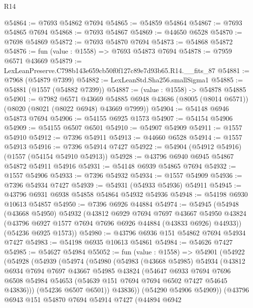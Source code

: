 \begin{lexlean}{R14}
\begin{coremodule}
@54864 := @7693 @54862 @7694
@54865 := @54859 @54864
@54867 := @7693 @54865 @7694
@54868 := @7693 @54867
@54869 := @44650 @6528
@54870 := @7698 @54869
@54872 := @7693 @54870 @7694
@54873 := @54868 @54872
@54876 := fun (value : @1558) => @7693 @54873 @7694
@54878 := @7959 @6571 @43669
@54879 := LexLeanPreserve.C798b143e659cb50f0f127c89e7d93b65.R14.__fits_87
@54881 := @7968 (@54879 @7399)
@54882 := LexLeanStd.Sha256.smallSigma1
@54885 := @54881 (@1557 (@54882 @7399))
@54887 := (value : @1558) -> @54878 @54885
@54901 := @7982
    @6571
    @43669
    @54885
    @6948
    @43686
    (@8005 (@8014 @6571))
    (@8020 (@8021 (@8022 @6948) @43669 @7999))
@54904 := @54148 @6946 @54873 @7694
@54906 := @54155 @6925 @1573
@54907 := @54154 @54906
@54909 := @54155 @6507 @6501
@54910 := @54907 @54909
@54911 := @1557 @54910
@54912 := @7396 @54911
@54913 := @44660 @6528
@54914 := @1557 @54913
@54916 := @7396 @54914 @7427
@54922 := @54904 (@54912 @54916) (@1557 (@54154 @54910 @54913))
@54928 := @43796 @6940 @6945 @54867 @54872 @54911 @54916
@54931 := @54148 @6939 @54865 @7694
@54932 := @1557 @54906
@54933 := @7396 @54932
@54934 := @1557 @54909
@54936 := @7396 @54934 @7427
@54939 := @54931 (@54933 @54936) @54911
@54945 := @43796 @6931 @6938 @54858 @54864 @54932 @54936
@54948 := @54198 @6930 @10613 @54857
@54950 := @7396 @6926 @44884
@54974 := @54945
    (@54948
      (@43668 @54950)
      @54932
      (@43812
        @6929
        @7694
        @7697
        @43667
        @54950
        @43824
        (@43796 @6927 @1577 @7694 @7696 @6926 @44884 (@43833 @6926) @44933))
      (@54236 @6925 @1573))
@54980 := @43796 @6936 @151 @54862 @7694 @54934 @7427
@54983 := @54198 @6935 @10613 @54861
@54984 := @54626 @7427
@54985 := @54627 @54984
@55052 := fun (value : @1558) =>
  @54901
    (@54922
      (@54928
        (@54939
          (@54974
            (@54980
              (@54983
                (@43668 @54985)
                @54934
                (@43812
                  @6934
                  @7694
                  @7697
                  @43667
                  @54985
                  @43824
                  (@54647
                    @6933
                    @7694
                    @7696
                    @6508
                    @54984
                    @54653
                    (@54639 @151 @7694 @7694 @6502 @7427 @54645 @43836)))
                (@54236 @6507 @6501))
              @43836))
          (@54290 @54906 @54909))
        (@43796
          @6943
          @151
          @54870
          @7694
          @54914
          @7427
          (@44894
            @6942

\end{coremodule}
\end{lexlean}
